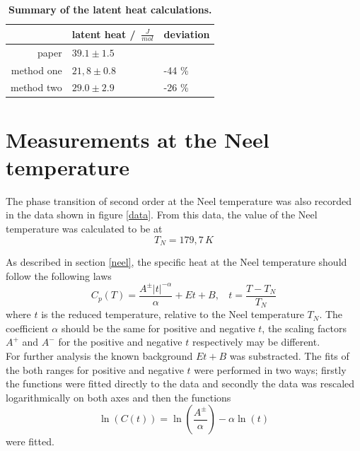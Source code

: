 \documentclass{include/thesisclass3}
\newcommand{\e}[1]{\,\si{#1}}
\begin{document}
\begin{table}[H]
\centering
\caption{\label{latentheattable}\textbf{Summary of the latent heat calculations.}}
\begin{tabular}{r|l|l}
 & latent heat / $\e{\frac{J}{mol}}$ & deviation\\
\midrule
paper & $39.1 \pm 1.5$ & \\
method one & $21,8 \pm 0.8$ & -44 \%\\
method two & $29.0 \pm 2.9$ & -26 \%\\
\midrule
\end{tabular}
\end{table}
\section{Measurements at the Neel temperature}

The phase transition of second order at the Neel temperature was also recorded in the data shown in figure \ref{data}.
From this data, the value of the Neel temperature was calculated to be at
\[T_N = 179,7\e{K}\]

As described in section \ref{neel}, the specific heat at the Neel temperature should follow the following laws
\[ C_p(T) = \frac{ A^\pm |t|^{-\alpha}}{\alpha} + Et + B, ~~~~ t = \frac{T-T_N}{T_N}\] 
where $t$ is the reduced temperature, relative to the Neel temperature $T_N$. The coefficient $\alpha$ should be the same for positive and negative $t$, the scaling factors $A^+$ and $A^-$ for the positive and negative $t$ respectively may be different.\\
For further analysis the known background $E t + B$ was substracted. 
The fits of the both ranges for positive and negative $t$ were performed in two ways; firstly the functions were fitted directly to the data and secondly the data was rescaled logarithmically on both axes and then the functions
\[ \ln(C(t)) = \ln \left( \frac{A^\pm}{\alpha}\right) - \alpha \ln (t) \]
were fitted.
\end{document}
